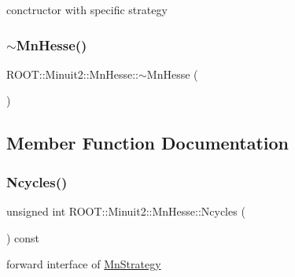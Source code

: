 conctructor with specific strategy 

\mbox{\label{classROOT_1_1Minuit2_1_1MnHesse_a7e8672c0a87502a0c75c6c0f9923f7b8}} 
\subsubsection{\texorpdfstring{$\sim$MnHesse()}{~MnHesse()}\hspace{0.1cm}{\footnotesize\ttfamily [2/2]}}
{\footnotesize\ttfamily R\+O\+O\+T\+::\+Minuit2\+::\+Mn\+Hesse\+::$\sim$\+Mn\+Hesse (\begin{DoxyParamCaption}{ }\end{DoxyParamCaption})\hspace{0.3cm}{\ttfamily [inline]}}



\subsection{Member Function Documentation}
\mbox{\label{classROOT_1_1Minuit2_1_1MnHesse_a5a84b9459469f2edf55f28d8d579a00d}} 
\subsubsection{\texorpdfstring{Ncycles()}{Ncycles()}\hspace{0.1cm}{\footnotesize\ttfamily [1/2]}}
{\footnotesize\ttfamily unsigned int R\+O\+O\+T\+::\+Minuit2\+::\+Mn\+Hesse\+::\+Ncycles (\begin{DoxyParamCaption}{ }\end{DoxyParamCaption}) const\hspace{0.3cm}{\ttfamily [inline]}}



forward interface of \mbox{\hyperlink{classROOT_1_1Minuit2_1_1MnStrategy}{Mn\+Strategy}} 

